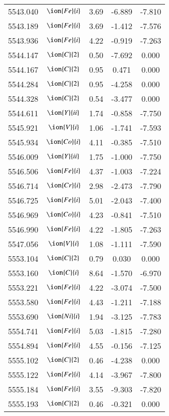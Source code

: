 \documentclass[fleqn,usenatbib]{mnras}
\begin{document}
\begin{center}
\begin{table}
\begin{tabular}{ccccc}
5543.040 &  $\ion{Fe}{i}$  & 3.69 & -6.889 & -7.810 \\ 
5543.189 &  $\ion{Fe}{i}$  & 3.69 & -1.412 & -7.576 \\ 
5543.936 &  $\ion{Fe}{i}$  & 4.22 & -0.919 & -7.263 \\ 
5544.147 &  $\ion{C}{2}$ & 0.50 & -7.692 & 0.000 \\ 
5544.167 &  $\ion{C}{2}$ & 0.95 & 0.471 & 0.000 \\ 
5544.284 &  $\ion{C}{2}$ & 0.95 & -4.258 & 0.000 \\ 
5544.328 &  $\ion{C}{2}$ & 0.54 & -3.477 & 0.000 \\ 
5544.611 &  $\ion{Y}{ii}$  & 1.74 & -0.858 & -7.750 \\ 
5545.921 &  $\ion{V}{i}$  & 1.06 & -1.741 & -7.593 \\ 
5545.934 &  $\ion{Co}{i}$  & 4.11 & -0.385 & -7.510 \\ 
5546.009 &  $\ion{Y}{ii}$  & 1.75 & -1.000 & -7.750 \\ 
5546.506 &  $\ion{Fe}{i}$  & 4.37 & -1.003 & -7.224 \\ 
5546.714 &  $\ion{Cr}{i}$  & 2.98 & -2.473 & -7.790 \\ 
5546.725 &  $\ion{Fe}{i}$  & 5.01 & -2.043 & -7.400 \\ 
5546.969 &  $\ion{Co}{i}$  & 4.23 & -0.841 & -7.510 \\ 
5546.990 &  $\ion{Fe}{i}$  & 4.22 & -1.805 & -7.263 \\ 
5547.056 &  $\ion{V}{i}$  & 1.08 & -1.111 & -7.590 \\ 
5553.104 &  $\ion{C}{2}$ & 0.79 & 0.030 & 0.000 \\ 
5553.160 &  $\ion{C}{i}$  & 8.64 & -1.570 & -6.970 \\ 
5553.221 &  $\ion{Fe}{i}$  & 4.22 & -3.074 & -7.500 \\ 
5553.580 &  $\ion{Fe}{i}$  & 4.43 & -1.211 & -7.188 \\ 
5553.690 &  $\ion{Ni}{i}$  & 1.94 & -3.125 & -7.783 \\ 
5554.741 &  $\ion{Fe}{i}$  & 5.03 & -1.815 & -7.280 \\ 
5554.894 &  $\ion{Fe}{i}$  & 4.55 & -0.156 & -7.125 \\ 
5555.102 &  $\ion{C}{2}$ & 0.46 & -4.238 & 0.000 \\ 
5555.122 &  $\ion{Fe}{i}$  & 4.14 & -3.967 & -7.800 \\ 
5555.184 &  $\ion{Fe}{i}$  & 3.55 & -9.303 & -7.820 \\ 
5555.193 &  $\ion{C}{2}$ & 0.46 & -0.321 & 0.000 \\ 

\end{tabular}
\end{table}
\end{center}
\end{document}
